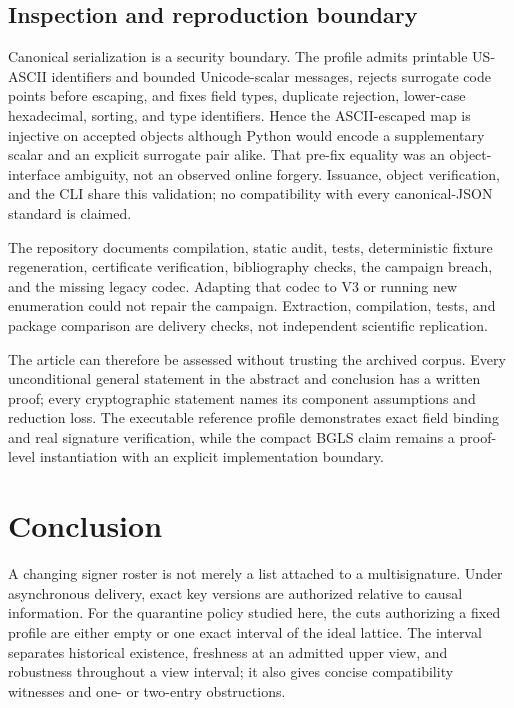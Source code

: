 \documentclass[11pt]{article}
\theoremstyle{definition}
\begin{document}
\subsection{Inspection and reproduction boundary}
Canonical serialization is a security boundary.  The profile admits printable US-ASCII identifiers and bounded Unicode-scalar messages, rejects surrogate code points before escaping, and fixes field types, duplicate rejection, lower-case hexadecimal, sorting, and type identifiers.  Hence the ASCII-escaped map is injective on accepted objects although Python would encode a supplementary scalar and an explicit surrogate pair alike.  That pre-fix equality was an object-interface ambiguity, not an observed online forgery.  Issuance, object verification, and the CLI share this validation; no compatibility with every canonical-JSON standard is claimed.

The repository documents compilation, static audit, tests, deterministic fixture regeneration, certificate verification, bibliography checks, the campaign breach, and the missing legacy codec.  Adapting that codec to V3 or running new enumeration could not repair the campaign.  Extraction, compilation, tests, and package comparison are delivery checks, not independent scientific replication.

The article can therefore be assessed without trusting the archived corpus.  Every unconditional general statement in the abstract and conclusion has a written proof; every cryptographic statement names its component assumptions and reduction loss.  The executable reference profile demonstrates exact field binding and real signature verification, while the compact BGLS claim remains a proof-level instantiation with an explicit implementation boundary.

\section{Conclusion}\label{sec:conclusion}
A changing signer roster is not merely a list attached to a multisignature.  Under asynchronous delivery, exact key versions are authorized relative to causal information.  For the quarantine policy studied here, the cuts authorizing a fixed profile are either empty or one exact interval of the ideal lattice.  The interval separates historical existence, freshness at an admitted upper view, and robustness throughout a view interval; it also gives concise compatibility witnesses and one- or two-entry obstructions.
\end{document}
